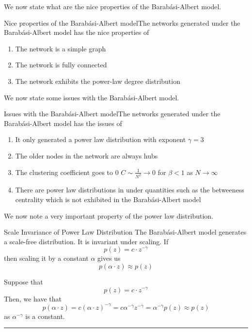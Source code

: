 \documentclass[twoside]{article}
\newenvironment{proof}{{\bf Proof:}}{\hfill\rule{2mm}{2mm}}
\begin{document}
We now state what are the nice properties of the Barabási-Albert model.

\begin{proposition_exam}{Nice properties of the Barabási-Albert model}{}The networks generated under the Barabási-Albert model has the nice properties of 
\begin{enumerate}
\item The network is a simple graph 
\item The network is fully connected 
\item The network exhibits the power-law degree distribution
\end{enumerate}
\end{proposition_exam}

We now state some issues with the Barabási-Albert model.
\begin{proposition_exam}{Issues with the Barabási-Albert model}{}The networks generated under the Barabási-Albert model has the issues of 
\begin{enumerate}
\item It only generated a power law distribution with exponent $\gamma = 3$
\item The older nodes in the network are always hubs
\item The clustering coefficient goes to 0 $C \sim \frac{1}{N^{\beta}} \rightarrow 0$ for $\beta < 1$ as $N \rightarrow \infty$
\item There are power law distributions in under quantities such as the betweeness centrality which is not exhibited in the Barabási-Albert model
\end{enumerate}
\end{proposition_exam}



We now note a very important property of the power law distribution.

\begin{theorem_exam}{Scale Invariance of Power Law Distribution}{} The Barabási-Albert model generates a scale-free distribution. It is invariant under scaling. If 
$$
p(z) = c\cdot z^{-\gamma}
$$
then scaling it by a constant $\alpha$ gives us
$$
p(\alpha \cdot z) \approx p(z)
$$
\end{theorem_exam}
\begin{proof} Suppose that 
$$
p(z) = c\cdot z^{-\gamma}
$$
Then, we have that 
$$
p(\alpha \cdot z) = c(\alpha \cdot z)^{-\gamma} = c \alpha^{-\gamma}z^{-\gamma} = \alpha^{-\gamma}p(z) \approx p(z)
$$
as $\alpha^{-\gamma}$ is a constant.
\end{proof}
\end{document}
